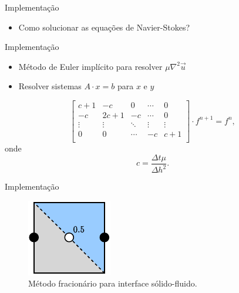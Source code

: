 \documentclass[aspectratio=169,xcolor=dvipsnames]{beamer}
\begin{document}
\begin{frame}{Implementação}
    \begin{itemize}
        \item Como solucionar as equações de Navier-Stokes?
    \end{itemize}
\end{frame}

\begin{frame}{Implementação}
\begin{itemize}
    \item Método de Euler implícito para resolver $\mu\nabla^2\Vec{u}$
    \item Resolver sistemas $A \cdot x = b$ para $x$ e $y$
\end{itemize}
\vspace{10px}
    \begin{equation}
        \begin{bmatrix}
            c+1 & -c   &  0 & \cdots & 0 \\
            -c  & 2c+1 & -c & \cdots & 0 \\
            \vdots & \vdots & \ddots & \vdots & \vdots \\
            0 & 0 & \cdots & -c & c+1 \\
        \end{bmatrix}
        \cdot f^{n+1} = f^n,
    \end{equation}
    onde
    \begin{equation}
        c = \frac{\Delta t \mu}{\Delta h^2}.
    \end{equation}
\end{frame}


\begin{frame}{Implementação}
    \begin{figure}
        \centering
        \includegraphics[scale=1.5]{figures/FractionalGrid.pdf}
        \caption{Método fracionário para interface sólido-fluido.}
        \label{fig:fractionalgrid}
    \end{figure}
\end{frame}
\end{document}
